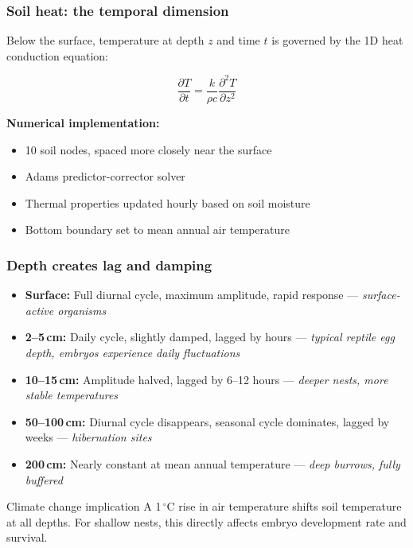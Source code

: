 \documentclass{beamer}
\begin{document}
\begin{frame}
  \frametitle{Soil heat: the temporal dimension}

  Below the surface, temperature at depth $z$ and time $t$ is governed by the 1D heat conduction equation:

  \[
    \frac{\partial T}{\partial t} = \frac{k}{\rho c} \frac{\partial^2 T}{\partial z^2}
  \]

  \vspace{0.2cm}

  \textbf{Numerical implementation:}
  \begin{itemize}
    \item 10 soil nodes, spaced more closely near the surface
    \item Adams predictor-corrector solver
    \item Thermal properties updated hourly based on soil moisture
    \item Bottom boundary set to mean annual air temperature
  \end{itemize}
\end{frame}

\begin{frame}
  \frametitle{Depth creates lag and damping}

  \begin{itemize}
    \item \textbf{Surface:} Full diurnal cycle, maximum amplitude, rapid response --- \textit{surface-active organisms}
    \item \textbf{2--5\,cm:} Daily cycle, slightly damped, lagged by hours --- \textit{typical reptile egg depth, embryos experience daily fluctuations}
    \item \textbf{10--15\,cm:} Amplitude halved, lagged by 6--12 hours --- \textit{deeper nests, more stable temperatures}
    \item \textbf{50--100\,cm:} Diurnal cycle disappears, seasonal cycle dominates, lagged by weeks --- \textit{hibernation sites}
    \item \textbf{200\,cm:} Nearly constant at mean annual temperature --- \textit{deep burrows, fully buffered}
  \end{itemize}

  \vspace{0.2cm}

  \begin{alertblock}{Climate change implication}
    A 1$\,^\circ$C rise in air temperature shifts soil temperature at all depths. For shallow nests, this directly affects embryo development rate and survival.
  \end{alertblock}
\end{frame}
\end{document}
